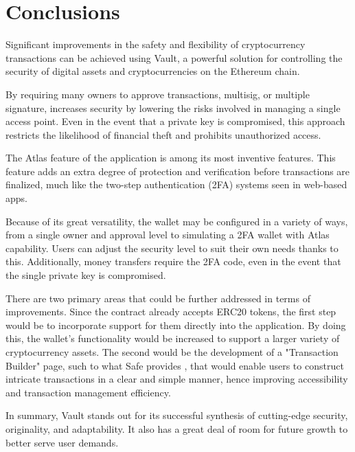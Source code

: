 \chapter{Conclusions}
\label{conclusions}
Significant improvements in the safety and flexibility of cryptocurrency transactions can be achieved using Vault, a powerful solution for controlling the security of digital assets and cryptocurrencies on the Ethereum chain.

By requiring many owners to approve transactions, multisig, or multiple signature, increases security by lowering the risks involved in managing a single access point. Even in the event that a private key is compromised, this approach restricts the likelihood of financial theft and prohibits unauthorized access.

The Atlas feature of the application is among its most inventive features. This feature adds an extra degree of protection and verification before transactions are finalized, much like the two-step authentication (2FA) systems seen in web-based apps. 

Because of its great versatility, the wallet may be configured in a variety of ways, from a single owner and approval level to simulating a 2FA wallet with Atlas capability. Users can adjust the security level to suit their own needs thanks to this. Additionally, money transfers require the 2FA code, even in the event that the single private key is compromised.

There are two primary areas that could be further addressed in terms of improvements. Since the contract already accepts ERC20 tokens, the first step would be to incorporate support for them directly into the application. By doing this, the wallet's functionality would be increased to support a larger variety of cryptocurrency assets. The second would be the development of a "Transaction Builder" page, such to what Safe provides \cite{transactionBuilder}, that would enable users to construct intricate transactions in a clear and simple manner, hence improving accessibility and transaction management efficiency.

In summary, Vault stands out for its successful synthesis of cutting-edge security, originality, and adaptability. It also has a great deal of room for future growth to better serve user demands.
